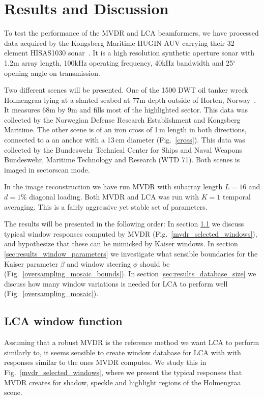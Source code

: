 \documentclass[10pt,journal,draftclsnofoot,onecolumn]{IEEEtran}
\newcommand\Fig[1]{Fig.~\ref{#1}}
\newcommand\1{\vec 1}
\begin{document}
\section{Results and Discussion}\label{sec:results_discussion}


To test the performance of the MVDR and LCA beamformers, we have processed data acquired by the Kongsberg Maritime HUGIN AUV carrying their 32 element HISAS1030 sonar~\cite{Hansen2009}. It is a high resolution synthetic aperture sonar with 1.2\;m array length, 100\;kHz operating frequency, 40\;kHz bandwidth and 25$^\circ$ opening angle on transmission.

Two different scenes will be presented. One of the 1500 DWT oil tanker wreck Holmengraa lying at a slanted seabed at 77\;m depth outside of Horten, Norway~\cite{holmengraa}. It measures 68\;m by 9\;m and fills most of the highlighted sector. This data was collected by the Norwegian Defense Research Establishment and Kongsberg Maritime. The other scene is of an iron cross of 1\,m length in both directions, connected to a an anchor with a 13\,cm diameter (\Fig{cross}). This data was collected by the Bundeswehr Technical Center for Ships and Naval Weapons Bundeswehr, Maritime Technology and Research (WTD 71). Both scenes is imaged in sectorscan mode.

In the image reconstruction we have run MVDR with subarray length $L=16$ and $d=1\%$ diagonal loading. Both MVDR and LCA was run with $K=1$ temporal averaging. This is a fairly aggressive yet stable set of parameters. 

The results will be presented in the following order: In section \ref{sec:results_lca_window_function} we discuss typical window responses computed by MVDR (\Fig{mvdr_selected_windows}), and hypothesize  that these can be mimicked by Kaiser windows. In section \ref{sec:results_window_parameters} we investigate what sensible boundaries for the Kaiser parameter $\beta$ and window steering $\phi$ should be (\Fig{oversampling_mosaic_bounds}). In section \ref{sec:results_database_size} we discuss how many window variations is needed for LCA to perform well (\Fig{oversampling_mosaic}). 

\subsection{LCA window function}\label{sec:results_lca_window_function}

Assuming that a robust MVDR is the reference method we want LCA to perform similarly to, it seems sensible to create window database for LCA with with responses similar to the ones MVDR computes. We study this in \Fig{mvdr_selected_windows}, where we present the typical responses that MVDR creates for shadow, speckle and highlight regions of the Holmengraa scene.
\end{document}

